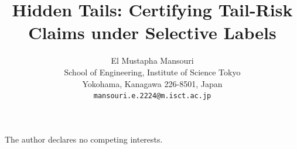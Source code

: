 \documentclass{article}
\title{Hidden Tails: Certifying Tail-Risk Claims under Selective Labels}
\author{%
  El Mustapha Mansouri \\
  School of Engineering, Institute of Science Tokyo \\
  Yokohama, Kanagawa 226-8501, Japan \\
  \texttt{mansouri.e.2224@m.isct.ac.jp}
}
\date{}
\theoremstyle{definition}
\theoremstyle{remark}
\theoremstyle{plain}
\begin{document}
\maketitle









\label{main-text-end}
\FloatBarrier
\clearpage
\begin{ack}
The author declares no competing interests.
\end{ack}


\clearpage
\appendix
{}
\makeatletter
\let\c@lemma\c@theorem
\let\c@proposition\c@theorem
\let\c@corollary\c@theorem
\let\c@definition\c@theorem
\let\c@example\c@theorem
\let\c@remark\c@theorem
\makeatother
\renewcommand{\thelemma}{\thetheorem}
\renewcommand{\theproposition}{\thetheorem}
\renewcommand{\thecorollary}{\thetheorem}
\renewcommand{\thedefinition}{\thetheorem}
\renewcommand{\theexample}{\thetheorem}
\renewcommand{\theremark}{\thetheorem}
\renewcommand{\theHlemma}{\theHtheorem}
\renewcommand{\theHproposition}{\theHtheorem}
\renewcommand{\theHcorollary}{\theHtheorem}
\renewcommand{\theHdefinition}{\theHtheorem}
\renewcommand{\theHexample}{\theHtheorem}
\renewcommand{\theHremark}{\theHtheorem}
\allowdisplaybreaks[2]






\FloatBarrier
\clearpage

\FloatBarrier
\clearpage

\end{document}
